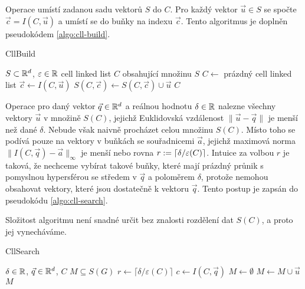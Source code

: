 Operace  umístí zadanou sadu vektorů $S$ do  $C$. Pro každý vektor $\vec{u} \in S$ se spočte $\vec{c} = I(C, \vec{u})$ a umístí se do buňky na indexu $\vec{c}$. Tento algoritmus je doplněn pseudokódem \ref{algo:cll-build}.

\begin{algorithm}[ht!]
  \caption{CllBuild}
  \label{algo:cll-build}
  \begin{algorithmic}
    \Require $S \subset \mathbb{R}^d$, $\varepsilon \in \mathbb{R}$
    \Ensure cell linked list $C$ obsahující množinu $S$
    \State $C \leftarrow$ prázdný cell linked list
      \State $\vec{c} \leftarrow I(C, \vec{u})$
      \State $S(C, \vec{c}) \leftarrow S(C, \vec{c}) \cup \vec{u}$
    \EndFor
    \State \Return $C$
  \end{algorithmic}
\end{algorithm}

Operace  pro daný vektor $\vec{q} \in \mathbb{R}^d$ a reálnou hodnotu $\delta \in \mathbb{R}$ nalezne všechny vektory $\vec{u}$ v množině $S(C)$, jejichž Euklidovská vzdálenost $\|\vec{u} - \vec{q}\|$ je menší než dané $\delta$. Nebude však naivně procházet celou množinu $S(C)$. Místo toho se podívá pouze na vektory v buňkách se souřadnicemi $\vec{a}$, jejichž maximová norma $\|I(C, \vec{q}) - \vec{a}\|_\infty$ je menší nebo rovna $r := \lceil\delta / \varepsilon(C)\rceil$. Intuice za volbou $r$ je taková, že nechceme vybírat takové buňky, které mají prázdný průnik s pomyslnou hypersférou se středem v $\vec{q}$ a poloměrem $\delta$, protože nemohou obsahovat vektory, které jsou dostatečně  k vektoru $\vec{q}$. Tento postup je zapsán do pseudokódu \ref{algo:cll-search}.

Složitost algoritmu  není snadné určit bez znalosti rozdělení dat $S(C)$, a proto jej vynecháváme.

\begin{algorithm}[ht!]
  \caption{CllSearch}
  \label{algo:cll-search}
  \begin{algorithmic}
    \Require $\delta \in \mathbb{R}$, $\vec{q} \in \mathbb{R}^d$,  $C$
    \Ensure $M \subseteq S(G)$
    \State $r \leftarrow \lceil\delta / \varepsilon(C)\rceil$
    \State $c \leftarrow I(C, \vec{q})$
    \State $M \leftarrow \emptyset$
        \State $M \leftarrow M \cup \vec{u}$
      \EndFor
    \EndFor
    \State \Return $M$
  \end{algorithmic}
\end{algorithm}

